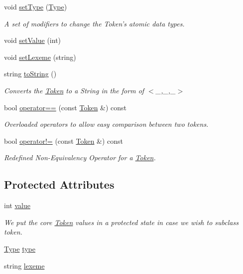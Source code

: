 \begin{DoxyCompactItemize}
\item 
void \hyperlink{classToken_a693d12716fcbf365e115dde0314ee306}{setType} (\hyperlink{token_8h_a1d1cfd8ffb84e947f82999c682b666a7}{Type})
\begin{DoxyCompactList}\small\item\em A set of modifiers to change the Token's atomic data types. \item\end{DoxyCompactList}\item 
void \hyperlink{classToken_ab015619f67bf97abb8d00a9037cafd49}{setValue} (int)
\item 
void \hyperlink{classToken_aed8a3626e2ef382587f66befa0f5761f}{setLexeme} (string)
\item 
string \hyperlink{classToken_a4e0ca338277bccb0f820f5149e82af79}{toString} ()
\begin{DoxyCompactList}\small\item\em Converts the \hyperlink{classToken}{Token} to a String in the form of $<$\_\-,\_\-,\_\-$>$ \item\end{DoxyCompactList}\item 
bool \hyperlink{classToken_afefbe9d487b40b055403fa2c41004d99}{operator==} (const \hyperlink{classToken}{Token} \&) const 
\begin{DoxyCompactList}\small\item\em Overloaded operators to allow easy comparison between two tokens. \item\end{DoxyCompactList}\item 
bool \hyperlink{classToken_a2f5a82fe3f636917336cc5171f4f53c2}{operator!=} (const \hyperlink{classToken}{Token} \&) const 
\begin{DoxyCompactList}\small\item\em Redefined Non-\/Equivalency Operator for a \hyperlink{classToken}{Token}. \item\end{DoxyCompactList}\end{DoxyCompactItemize}
\subsection*{Protected Attributes}
\begin{DoxyCompactItemize}
\item 
int \hyperlink{classToken_a041346a45c6c5571a78a6af3394a2756}{value}
\begin{DoxyCompactList}\small\item\em We put the core \hyperlink{classToken}{Token} values in a protected state in case we wish to subclass token. \item\end{DoxyCompactList}\item 
\hyperlink{token_8h_a1d1cfd8ffb84e947f82999c682b666a7}{Type} \hyperlink{classToken_a7e5e6513d379ca2e388273b23ea1ba4a}{type}
\item 
string \hyperlink{classToken_af4c57a4ede01f2040ea4927141f5a661}{lexeme}
\end{DoxyCompactItemize}


